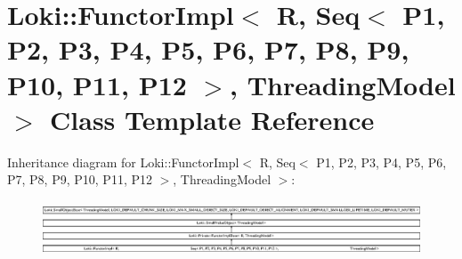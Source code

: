 \hypertarget{classLoki_1_1FunctorImpl_3_01R_00_01_01_01_01_01_01_01_01_01_01_01_01_01_01_01_01_01_01_01_01_011f98edb36b5671b9f4e136a08a7d1f1d}{}\section{Loki\+:\+:Functor\+Impl$<$ R, Seq$<$ P1, P2, P3, P4, P5, P6, P7, P8, P9, P10, P11, P12 $>$, Threading\+Model $>$ Class Template Reference}
\label{classLoki_1_1FunctorImpl_3_01R_00_01_01_01_01_01_01_01_01_01_01_01_01_01_01_01_01_01_01_01_01_011f98edb36b5671b9f4e136a08a7d1f1d}
Inheritance diagram for Loki\+:\+:Functor\+Impl$<$ R, Seq$<$ P1, P2, P3, P4, P5, P6, P7, P8, P9, P10, P11, P12 $>$, Threading\+Model $>$\+:\begin{figure}[H]
\begin{center}
\leavevmode
\includegraphics[height=1.669151cm]{classLoki_1_1FunctorImpl_3_01R_00_01_01_01_01_01_01_01_01_01_01_01_01_01_01_01_01_01_01_01_01_011f98edb36b5671b9f4e136a08a7d1f1d}
\end{center}
\end{figure}
